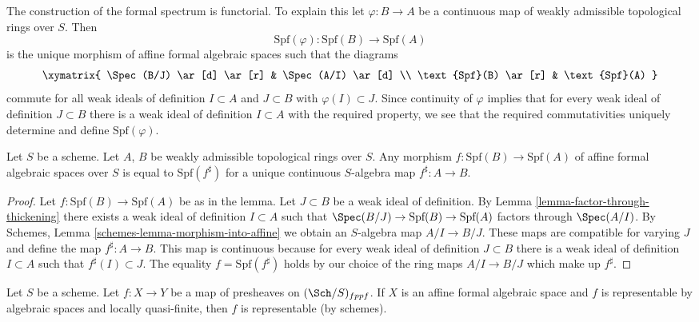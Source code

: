 \medskip\noindent
The construction of the formal spectrum is functorial. To explain this
let $\varphi : B \to A$ be a continuous map of weakly admissible
topological rings over $S$. Then
$$
\text{Spf}(\varphi) : \text{Spf}(B) \to \text{Spf}(A)
$$
is the unique morphism of affine formal algebraic spaces such that
the diagrams
$$
\xymatrix{
\Spec(B/J) \ar[d] \ar[r] & \Spec(A/I) \ar[d] \\
\text{Spf}(B) \ar[r] & \text{Spf}(A)
}
$$
commute for all weak ideals of definition $I \subset A$ and $J \subset B$
with $\varphi(I) \subset J$. Since continuity of $\varphi$
implies that for every weak ideal of definition $J \subset B$
there is a weak ideal of definition $I \subset A$ with the required
property, we see that the required commutativities uniquely
determine and define $\text{Spf}(\varphi)$.

\begin{lemma}
\label{lemma-morphism-between-formal-spectra}
Let $S$ be a scheme. Let $A$, $B$ be weakly admissible
topological rings over $S$. Any morphism $f : \text{Spf}(B) \to \text{Spf}(A)$
of affine formal algebraic spaces over $S$
is equal to $\text{Spf}(f^\sharp)$ for a unique continuous
$S$-algebra map $f^\sharp : A \to B$.
\end{lemma}

\begin{proof}
Let $f : \text{Spf}(B) \to \text{Spf}(A)$ be as in the lemma.
Let $J \subset B$ be a weak ideal of definition. By
Lemma \ref{lemma-factor-through-thickening}
there exists a weak ideal of definition $I \subset A$ such that
$\Spec(B/J) \to \text{Spf}(B) \to \text{Spf}(A)$
factors through $\Spec(A/I)$. By
Schemes, Lemma \ref{schemes-lemma-morphism-into-affine}
we obtain an $S$-algebra map $A/I \to B/J$.
These maps are compatible for varying $J$ and define the
map $f^\sharp : A \to B$. This map is continuous because
for every weak ideal of definition $J \subset B$ there is a
weak ideal of definition $I \subset A$ such that
$f^\sharp(I) \subset J$. The equality $f = \text{Spf}(f^\sharp)$
holds by our choice of the ring maps $A/I \to B/J$ which make up $f^\sharp$.
\end{proof}

\begin{lemma}
\label{lemma-presentation-representable}
Let $S$ be a scheme. Let $f : X \to Y$ be a map
of presheaves on $(\Sch/S)_{fppf}$. If $X$ is an affine formal algebraic
space and $f$ is representable by algebraic spaces and locally quasi-finite,
then $f$ is representable (by schemes).
\end{lemma}

